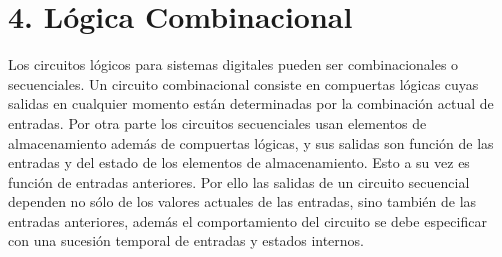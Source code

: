 \newpage
\section*{4. L\'{o}gica Combinacional}
Los circuitos l\'{o}gicos para
sistemas digitales pueden ser combinacionales o secuenciales. Un circuito
combinacional consiste en compuertas l\'{o}gicas cuyas salidas en cualquier
momento est\'{a}n determinadas por la combinaci\'{o}n actual de entradas. Por
otra parte los circuitos secuenciales usan elementos de almacenamiento
adem\'{a}s de compuertas l\'{o}gicas, y sus salidas son funci\'{o}n de las
entradas y del estado de los elementos de almacenamiento. Esto a su vez es
funci\'{o}n de entradas anteriores. Por ello las salidas de un circuito
secuencial dependen no s\'{o}lo de los valores actuales de las entradas, sino
tambi\'{e}n de las entradas anteriores, adem\'{a}s el comportamiento del
circuito se debe especificar con una sucesi\'{o}n temporal de entradas y estados
internos.

